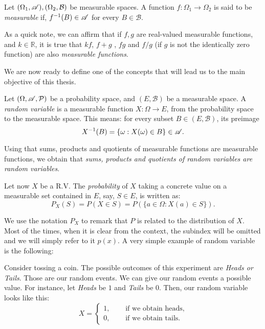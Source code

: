 \begin{ndef}
Let $(\Omega_1, \mathscr{A}),(\Omega_2, \mathcal B)$ be measurable spaces. A function $f: \Omega_1 \to \Omega_2$ is said to be \emph{measurable} if, $f^{-1}(B) \in \mathscr{A}$ for every $B \in \mathcal B$.
\end{ndef}

As a quick note, we can affirm that if $f,g$ are real-valued measurable functions, and $k \in \mathbb R$, it is true that $kf$, $f+g$ , $fg$ and $f/g$ (if $g$ is not the identically zero function) are also \emph{measurable functions}.

We are now ready to define one of the concepts that will lead us to the main objective of this thesis.

\begin{ndef}
Let $(\Omega,\mathscr{A},\mathcal{P})$ be a probability space, and $(E,\mathcal B)$ be a measurable space. 
A \emph{random variable} is a measurable function $X: \Omega \to E$, from the probability space to the measurable space. This means: for every subset $B \in (E,\mathcal B)$, its preimage
$$
X^{-1}(B) = \{\omega : X(\omega) \in B\} \in \mathscr{A} .
$$
\end{ndef}

Using that sums, products and quotients of measurable functions are measurable functions, we obtain that \emph{sums, products and quotients of random variables are random variables}.

Let now $X$ be a R.V. The \emph{probability} of $X$ taking a concrete value on a measurable set contained in $E$, say, $S \in E$, is written as:
$$
P_X(S) = P(X \in S) = P(\{a \in \Omega : X(a) \in S\}).
$$

We use the notation $P_X$ to remark that $P$ is related to the distribution of $X$. Most of the times, when it is clear from the context, the subindex will be omitted and we will simply refer to it $p(x)$. A very simple example of random variable is the following:

\begin{nexample}
  Consider tossing a coin. The possible outcomes of this experiment are \emph{Heads or Tails}. Those are our random events. We can give our random events a possible value. 
  For instance, let \emph{Heads} be $1$ and \emph{Tails} be $0$. Then, our random variable looks like this:
  \begin{equation*}
      X  = \left\{ \begin{aligned}
  1, \quad & \text{ if we obtain heads,} \\
  0, \quad & \text{ if we obtain tails.}
\end{aligned}\right.
  \end{equation*}

\end{nexample}

